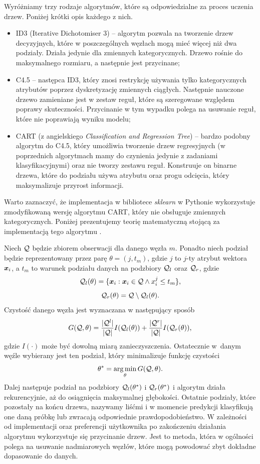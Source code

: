 \documentclass[inzynierska]{pwr_wmat_praca_dyplomowa}
\theoremstyle{plain}
\numberwithin{theorem}{chapter}
\theoremstyle{definition}
\numberwithin{theorem}{chapter}
\DeclareMathOperator*{\argmin}{arg\,min}
\begin{document}
Wyróżniamy trzy rodzaje algorytmów, które są odpowiedzialne za proces uczenia drzew. Poniżej krótki opis każdego z nich.
\begin{itemize}
	\item ID3 (Iterative Dichotomiser 3) -- algorytm pozwala na tworzenie drzew decyzyjnych, które w poszczególnych węzłach mogą mieć więcej niż dwa podziały. Działa jedynie dla zmiennych kategorycznych. Drzewo rośnie do maksymalnego rozmiaru, a następnie jest przycinane;
	\item C4.5 -- następca ID3, który znosi restrykcję używania tylko kategorycznych atrybutów poprzez dyskretyzację zmiennych ciągłych. Następnie nauczone drzewo zamieniane jest w zestaw reguł, które są szeregowane względem poprawy skuteczności. Przycinanie w tym wypadku polega na usuwanie reguł, które nie poprawiają wyniku modelu;
	\item CART (z angielskiego \textit{Classification and Regression Tree}) -- bardzo podobny algorytm do C4.5, który umożliwia tworzenie drzew regresyjnych (w poprzednich algorytmach mamy do czynienia jedynie z zadaniami klasyfikacyjnymi) oraz nie tworzy zestawu reguł. Konstruuje on binarne drzewa, które do podziału używa atrybutu oraz progu odcięcia, który maksymalizuje przyrost informacji.
\end{itemize}
Warto zaznaczyć, że implementacja w bibliotece \textit{sklearn} w Pythonie wykorzystuje zmodyfikowaną wersję algorytmu CART, który nie obsługuje zmiennych kategorycznych. Poniżej prezentujemy teorię matematyczną stojącą za implementacją tego algorytmu \cite{sklearn_api}.

Niech $\mathcal{Q}$ będzie zbiorem obserwacji dla danego węzła $m$. Ponadto niech podział będzie reprezentowany przez parę $\theta = (j, t_m)$, gdzie $j$ to $j$-ty atrybut wektora $\boldsymbol{x}_i$, a $t_m$ to warunek podziału danych na podzbiory $\mathcal{Q}_l$ oraz $\mathcal{Q}_r$, gdzie
$$ \mathcal{Q}_l (\theta) = \{ \boldsymbol{x}_i : \boldsymbol{x}_i \in \mathcal{Q} \land x^{j}_i \leq t_m \} \text{,} $$
$$ \mathcal{Q}_r (\theta) = \mathcal{Q} \setminus \mathcal{Q}_l(\theta) \text{.} $$
Czystość danego węzła jest wyznaczana w następujący sposób
$$ G(\mathcal{Q}, \theta) = \frac{|\mathcal{Q}^l|}{|\mathcal{Q}|} I(\mathcal{Q}_l (\theta)) + \frac{|\mathcal{Q}^r|}{|\mathcal{Q}|} I(\mathcal{Q}_r (\theta)) \text{,}$$
gdzie $I(\cdot)$ może być dowolną miarą zanieczyszczenia. Ostatecznie w~danym węźle wybierany jest ten podział, który minimalizuje funkcję czystości
$$ \theta^* = \argmin_\theta G(\ku, \theta) \text{.}$$
Dalej następuje podział na podzbiory $\mathcal{Q}_l (\theta^*)$ i $\mathcal{Q}_r (\theta^*)$ i algorytm działa rekurencyjnie, aż do osiągnięcia maksymalnej głębokości. Ostatnie podziały, które pozostały na końcu drzewa, nazywamy liśćmi i w momencie predykcji klasyfikują one daną próbkę lub zwracają odpowiednie prawdopodobieństwo.
W zależności od implementacji oraz preferencji użytkownika po zakończeniu działania algorytmu wykorzystuje się przycinanie drzew. Jest to metoda, która w ogólności polega na usuwanie nadmiarowych węzłów, które mogą powodować zbyt dokładne dopasowanie do danych. 
\end{document}
